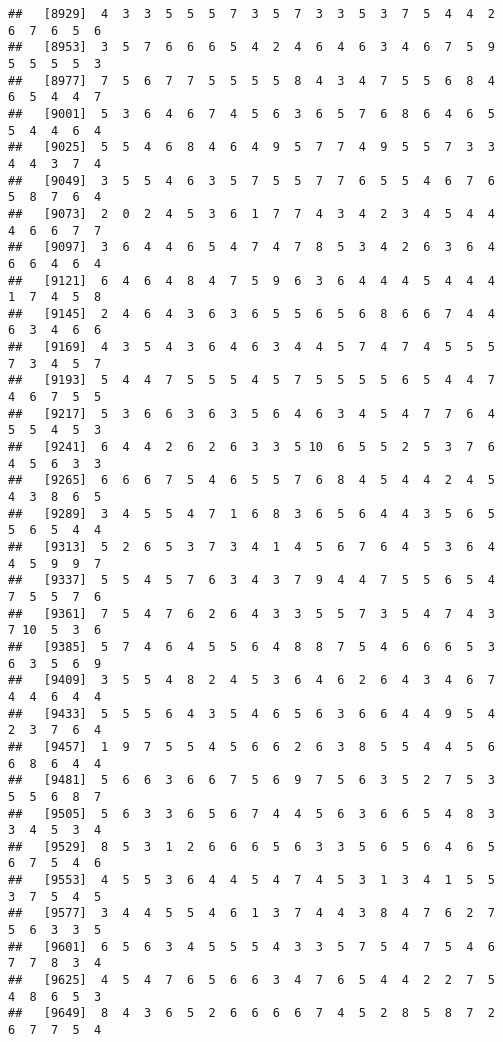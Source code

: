 \documentclass[
]{book}
\begin{document}
\begin{verbatim}
##   [8929]  4  3  3  5  5  5  7  3  5  7  3  3  5  3  7  5  4  4  2  6  7  6  5  6
##   [8953]  3  5  7  6  6  6  5  4  2  4  6  4  6  3  4  6  7  5  9  5  5  5  5  3
##   [8977]  7  5  6  7  7  5  5  5  5  8  4  3  4  7  5  5  6  8  4  6  5  4  4  7
##   [9001]  5  3  6  4  6  7  4  5  6  3  6  5  7  6  8  6  4  6  5  5  4  4  6  4
##   [9025]  5  5  4  6  8  4  6  4  9  5  7  7  4  9  5  5  7  3  3  4  4  3  7  4
##   [9049]  3  5  5  4  6  3  5  7  5  5  7  7  6  5  5  4  6  7  6  5  8  7  6  4
##   [9073]  2  0  2  4  5  3  6  1  7  7  4  3  4  2  3  4  5  4  4  4  6  6  7  7
##   [9097]  3  6  4  4  6  5  4  7  4  7  8  5  3  4  2  6  3  6  4  6  6  4  6  4
##   [9121]  6  4  6  4  8  4  7  5  9  6  3  6  4  4  4  5  4  4  4  1  7  4  5  8
##   [9145]  2  4  6  4  3  6  3  6  5  5  6  5  6  8  6  6  7  4  4  6  3  4  6  6
##   [9169]  4  3  5  4  3  6  4  6  3  4  4  5  7  4  7  4  5  5  5  7  3  4  5  7
##   [9193]  5  4  4  7  5  5  5  4  5  7  5  5  5  5  6  5  4  4  7  4  6  7  5  5
##   [9217]  5  3  6  6  3  6  3  5  6  4  6  3  4  5  4  7  7  6  4  5  5  4  5  3
##   [9241]  6  4  4  2  6  2  6  3  3  5 10  6  5  5  2  5  3  7  6  4  5  6  3  3
##   [9265]  6  6  6  7  5  4  6  5  5  7  6  8  4  5  4  4  2  4  5  4  3  8  6  5
##   [9289]  3  4  5  5  4  7  1  6  8  3  6  5  6  4  4  3  5  6  5  5  6  5  4  4
##   [9313]  5  2  6  5  3  7  3  4  1  4  5  6  7  6  4  5  3  6  4  4  5  9  9  7
##   [9337]  5  5  4  5  7  6  3  4  3  7  9  4  4  7  5  5  6  5  4  7  5  5  7  6
##   [9361]  7  5  4  7  6  2  6  4  3  3  5  5  7  3  5  4  7  4  3  7 10  5  3  6
##   [9385]  5  7  4  6  4  5  5  6  4  8  8  7  5  4  6  6  6  5  3  6  3  5  6  9
##   [9409]  3  5  5  4  8  2  4  5  3  6  4  6  2  6  4  3  4  6  7  4  4  6  4  4
##   [9433]  5  5  5  6  4  3  5  4  6  5  6  3  6  6  4  4  9  5  4  2  3  7  6  4
##   [9457]  1  9  7  5  5  4  5  6  6  2  6  3  8  5  5  4  4  5  6  6  8  6  4  4
##   [9481]  5  6  6  3  6  6  7  5  6  9  7  5  6  3  5  2  7  5  3  5  5  6  8  7
##   [9505]  5  6  3  3  6  5  6  7  4  4  5  6  3  6  6  5  4  8  3  3  4  5  3  4
##   [9529]  8  5  3  1  2  6  6  6  5  6  3  3  5  6  5  6  4  6  5  6  7  5  4  6
##   [9553]  4  5  5  3  6  4  4  5  4  7  4  5  3  1  3  4  1  5  5  3  7  5  4  5
##   [9577]  3  4  4  5  5  4  6  1  3  7  4  4  3  8  4  7  6  2  7  5  6  3  3  5
##   [9601]  6  5  6  3  4  5  5  5  4  3  3  5  7  5  4  7  5  4  6  7  7  8  3  4
##   [9625]  4  5  4  7  6  5  6  6  3  4  7  6  5  4  4  2  2  7  5  4  8  6  5  3
##   [9649]  8  4  3  6  5  2  6  6  6  6  7  4  5  2  8  5  8  7  2  6  7  7  5  4

\end{verbatim}
\end{document}
